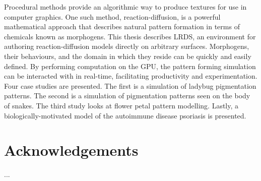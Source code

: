 \documentclass{thesis}
\newcommand{\ProgramName}{LRDS}
\theoremstyle{plain}
\theoremstyle{definition}
\begin{document}

  \begin{thesisabstract}  
Procedural methods provide an algorithmic way to produce textures for use in computer graphics. One such method, reaction-diffusion, is a powerful mathematical approach that describes natural pattern formation in terms of chemicals known as morphogens. This thesis describes \ProgramName{}, an environment for authoring reaction-diffusion models directly on arbitrary surfaces. Morphogens, their behaviours, and the domain in which they reside can be quickly and easily defined. By performing computation on the GPU, the pattern forming simulation can be interacted with in real-time, facilitating productivity and experimentation. Four case studies are presented. The first is a simulation of ladybug pigmentation patterns. The second is a simulation of pigmentation patterns seen on the body of snakes. The third study looks at flower petal pattern modelling. Lastly, a biologically-motivated model of the autoimmune disease psoriasis is presented.
  \end{thesisabstract}


  \chapter{Acknowledgements}  
  ...

    

  
\end{document}
